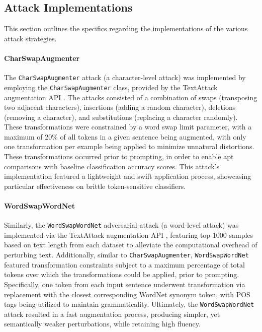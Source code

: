 \documentclass[conference]{IEEEtran}
\begin{document}
\subsection{Attack Implementations}

This section outlines the specifics regarding the implementations of the various attack strategies.

\paragraph{CharSwapAugmenter}
The \texttt{CharSwapAugmenter} attack (a character-level attack) was implemented by employing the \texttt{CharSwapAugmenter} class, provided by the TextAttack augmentation API \cite{textattack2020framework}. The attacks consisted of a combination of swaps (transposing two adjacent characters), insertions (adding a random character), deletions (removing a character), and substitutions (replacing a character randomly). These transformations were constrained by a word swap limit parameter, with a maximum of 20\% of all tokens in a given sentence being augmented, with only one transformation per example being applied to minimize unnatural distortions. These transformations occurred prior to prompting, in order to enable apt comparisons with baseline classification accuracy scores. This attack’s implementation featured a lightweight and swift application process, showcasing particular effectiveness on brittle token-sensitive classifiers.

\paragraph{WordSwapWordNet}
Similarly, the \texttt{WordSwapWordNet} adversarial attack (a word-level attack) was implemented via the TextAttack augmentation API \cite{textattack2020framework}, featuring top-1000 samples based on text length from each dataset to alleviate the computational overhead of perturbing text. Additionally, similar to \texttt{CharSwapAugmenter}, \texttt{WordSwapWordNet} featured transformation constraints subject to a maximum percentage of total tokens over which the transformations could be applied, prior to prompting. Specifically, one token from each input sentence underwent transformation via replacement with the closest corresponding WordNet synonym token, with POS tags being utilized to maintain grammaticality. Ultimately, the \texttt{WordSwapWordNet} attack resulted in a fast augmentation process, producing simpler, yet semantically weaker perturbations, while retaining high fluency.
\end{document}
